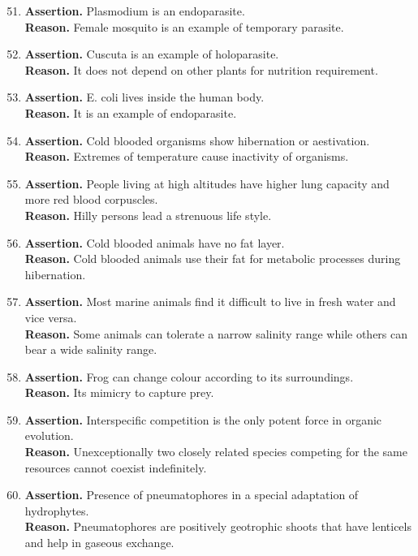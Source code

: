 \documentclass{article}
\begin{document}
\begin{enumerate}
    \setcounter{enumi}{50}
    \item \textbf{Assertion.} Plasmodium is an endoparasite. \\
    \textbf{Reason.} Female mosquito is an example of temporary parasite.
    \item \textbf{Assertion.} Cuscuta is an example of holoparasite. \\
    \textbf{Reason.} It does not depend on other plants for nutrition requirement.
    \item \textbf{Assertion.} E. coli lives inside the human body. \\
    \textbf{Reason.} It is an example of endoparasite.
    \item \textbf{Assertion.} Cold blooded organisms show hibernation or aestivation. \\
    \textbf{Reason.} Extremes of temperature cause inactivity of organisms.
    \item \textbf{Assertion.} People living at high altitudes have higher lung capacity and more red blood corpuscles. \\
    \textbf{Reason.} Hilly persons lead a strenuous life style.
    \item \textbf{Assertion.} Cold blooded animals have no fat layer. \\
    \textbf{Reason.} Cold blooded animals use their fat for metabolic processes during hibernation.
    \item \textbf{Assertion.} Most marine animals find it difficult to live in fresh water and vice versa. \\
    \textbf{Reason.} Some animals can tolerate a narrow salinity range while others can bear a wide salinity range.
    \item \textbf{Assertion.} Frog can change colour according to its surroundings. \\
    \textbf{Reason.} Its mimicry to capture prey.
    \item \textbf{Assertion.} Interspecific competition is the only potent force in organic evolution. \\
    \textbf{Reason.} Unexceptionally two closely related species competing for the same resources cannot coexist indefinitely.
    \item \textbf{Assertion.} Presence of pneumatophores in a special adaptation of hydrophytes. \\
    \textbf{Reason.} Pneumatophores are positively geotrophic shoots that have lenticels and help in gaseous exchange.

\end{enumerate}
\end{document}
